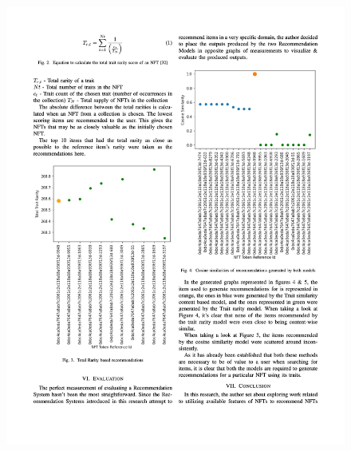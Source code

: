 \begin{figure}[h!]
\centering
\includegraphics[width=\textwidth]{images/appendix/papers/analysis/An Analysis of the Features Considerable for NFT Recommendations 4.jpeg}
\end{figure}

